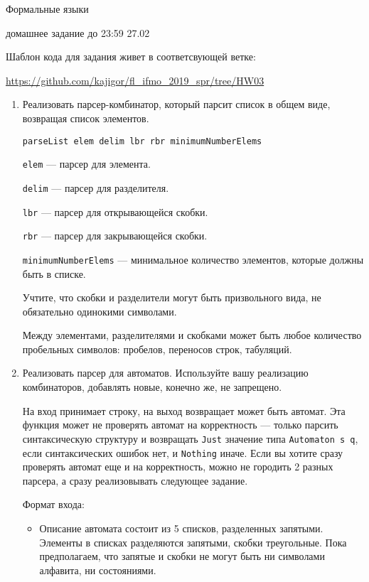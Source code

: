 \documentclass{article}
\begin{document}
\begin{center} {\LARGE Формальные языки} \end{center}

\begin{center} {\Large домашнее задание до 23:59 27.02} \end{center}
\bigskip

Шаблон кода для задания живет в соответсвующей ветке: 

\href{https://github.com/kajigor/fl_ifmo_2019_spr/tree/HW03}{https://github.com/kajigor/fl\_ifmo\_2019\_spr/tree/HW03}

\begin{enumerate}
  \item 
  {
    Реализовать парсер-комбинатор, который парсит список в общем виде, возвращая список элементов. 
    
    \verb!parseList elem delim lbr rbr minimumNumberElems!
    
    \verb!elem! --- парсер для элемента.
    
    \verb!delim! --- парсер для разделителя.
    
    \verb!lbr! --- парсер для открывающейся скобки.
    
    \verb!rbr! --- парсер для закрывающейся скобки.
    
    \verb!minimumNumberElems! --- минимальное количество элементов, которые должны быть в списке.
    
    Учтите, что скобки и разделители могут быть призвольного вида, не обязательно одинокими символами.
    
    Между элементами, разделителями и скобками может быть любое количество пробельных символов: пробелов, переносов строк, табуляций.
  }
  \item
  {
    Реализовать парсер для автоматов. Используйте вашу реализацию комбинаторов, добавлять новые, конечно же, не запрещено.
    
    На вход принимает строку, на выход возвращает может быть автомат. Эта функция может не проверять автомат на корректность --- только парсить синтаксическую структуру и возвращать \verb!Just! значение типа \verb!Automaton s q!, если синтаксических ошибок нет, и \verb!Nothing! иначе. Если вы хотите сразу проверять автомат еще и на корректность, можно не городить 2 разных парсера, а сразу реализовывать следующее задание. 
    
    Формат входа: 
    
    \begin{itemize}
        \item Описание автомата состоит из 5 списков, разделенных запятыми. Элементы в списках разделяются запятыми, скобки треугольные. Пока предполагаем, что запятые и скобки не могут быть ни символами алфавита, ни состояниями. 
        

\end{itemize}}
\end{enumerate}
\end{document}
